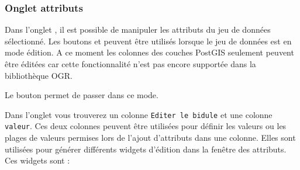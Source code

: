 \subsubsection{Onglet attributs}\label{label_attributes}
Dans l'onglet , il est possible de manipuler les attributs du jeu de données sélectionné. Les boutons  et  peuvent être utilisés lorsque le jeu de données est en mode édition. A ce moment les colonnes des couches PostGIS seulement peuvent être éditées car cette fonctionnalité n'est pas encore supportée dans la bibliothèque OGR.

Le bouton  permet de passer dans ce mode.


Dans l'onglet  vous trouverez un colonne \texttt{Editer le bidule} et une colonne \texttt{valeur}. Ces deux colonnes peuvent être utilisées pour définir les valeurs ou les plages de valeurs permises lors de l'ajout d'attributs dans une colonne. Elles sont utilisées pour générer différents widgets d'édition dans la fenêtre des attributs. Ces widgets sont :

